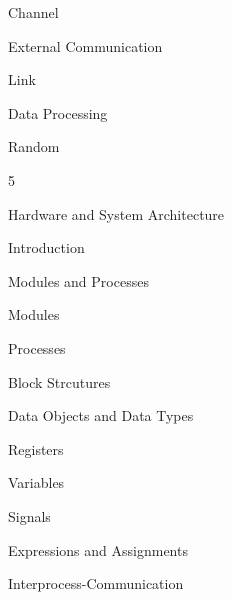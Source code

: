 \def\tocXLIX{Channel}
{\bf{\parbox{0.95\textwidth}{\hskip20pt\tocXLIX\dotfill\pageref{toclabelXLIX}}}}\vskip5pt

\def\tocL{External Communication}
{\bf{\parbox{0.95\textwidth}{\hskip10pt\tocL\dotfill\pageref{toclabelL}}}}\vskip5pt

\def\tocLI{Link }
{\bf{\parbox{0.95\textwidth}{\hskip20pt\tocLI\dotfill\pageref{toclabelLI}}}}\vskip5pt

\def\tocLII{Data Processing}
{\bf{\parbox{0.95\textwidth}{\hskip10pt\tocLII\dotfill\pageref{toclabelLII}}}}\vskip5pt

\def\tocLIII{Random}
{\bf{\parbox{0.95\textwidth}{\hskip20pt\tocLIII\dotfill\pageref{toclabelLIII}}}}\vskip5pt

\def\tocLIV{Hardware and System Architecture}
{\vskip5pt\bf\large\hskip-30pt\parbox{30pt}{ 5}\parbox{0.95\textwidth}{\tocLIV\dotfill\pageref{toclabelLIV}}}\vskip10pt

\def\tocLV{Introduction}
{\bf{\parbox{0.95\textwidth}{\hskip10pt\tocLV\dotfill\pageref{toclabelLV}}}}\vskip5pt

\def\tocLVI{Modules and Processes}
{\bf{\parbox{0.95\textwidth}{\hskip10pt\tocLVI\dotfill\pageref{toclabelLVI}}}}\vskip5pt

\def\tocLVII{Modules}
{\bf{\parbox{0.95\textwidth}{\hskip20pt\tocLVII\dotfill\pageref{toclabelLVII}}}}\vskip5pt

\def\tocLVIII{Processes}
{\bf{\parbox{0.95\textwidth}{\hskip20pt\tocLVIII\dotfill\pageref{toclabelLVIII}}}}\vskip5pt

\def\tocLIX{Block Strcutures}
{\bf{\parbox{0.95\textwidth}{\hskip10pt\tocLIX\dotfill\pageref{toclabelLIX}}}}\vskip5pt

\def\tocLX{Data Objects and Data Types}
{\bf{\parbox{0.95\textwidth}{\hskip10pt\tocLX\dotfill\pageref{toclabelLX}}}}\vskip5pt

\def\tocLXI{Registers}
{\bf{\parbox{0.95\textwidth}{\hskip20pt\tocLXI\dotfill\pageref{toclabelLXI}}}}\vskip5pt

\def\tocLXII{Variables}
{\bf{\parbox{0.95\textwidth}{\hskip20pt\tocLXII\dotfill\pageref{toclabelLXII}}}}\vskip5pt

\def\tocLXIII{Signals}
{\bf{\parbox{0.95\textwidth}{\hskip20pt\tocLXIII\dotfill\pageref{toclabelLXIII}}}}\vskip5pt

\def\tocLXIV{Expressions and Assignments}
{\bf{\parbox{0.95\textwidth}{\hskip20pt\tocLXIV\dotfill\pageref{toclabelLXIV}}}}\vskip5pt

\def\tocLXV{Interprocess-Communication}
{\bf{\parbox{0.95\textwidth}{\hskip10pt\tocLXV\dotfill\pageref{toclabelLXV}}}}\vskip5pt


